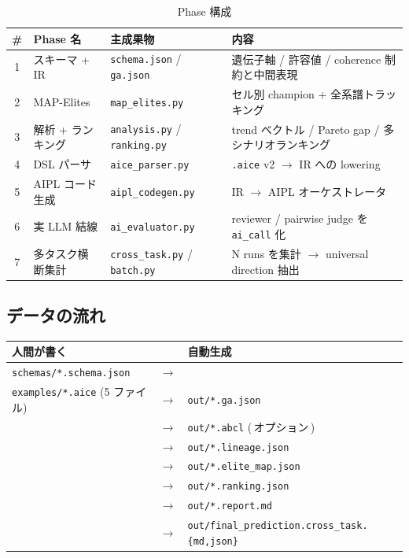 \documentclass[a4paper,11pt]{article}
\begin{document}
\begin{table}[h]
\centering
\caption{Phase 構成}
\label{tab:phases}
\small
\begin{tabularx}{\linewidth}{cllX}
\toprule
\# & Phase 名 & 主成果物 & 内容 \\
\midrule
1 & スキーマ + IR        & \texttt{schema.json} / \texttt{ga.json}    & 遺伝子軸 / 許容値 / coherence 制約と中間表現 \\
2 & MAP-Elites           & \texttt{map\_elites.py}                    & セル別 champion + 全系譜トラッキング \\
3 & 解析 + ランキング    & \texttt{analysis.py} / \texttt{ranking.py} & trend ベクトル / Pareto gap / 多シナリオランキング \\
4 & DSL パーサ           & \texttt{aice\_parser.py}                   & \texttt{.aice} v2 \(\to\) IR への lowering \\
5 & AIPL コード生成      & \texttt{aipl\_codegen.py}                  & IR \(\to\) AIPL オーケストレータ \\
6 & 実 LLM 結線          & \texttt{ai\_evaluator.py}                  & reviewer / pairwise judge を \texttt{ai\_call} 化 \\
7 & 多タスク横断集計     & \texttt{cross\_task.py} / \texttt{batch.py} & N runs を集計 \(\to\) universal direction 抽出 \\
\bottomrule
\end{tabularx}
\end{table}

\subsection{データの流れ}

\begin{center}
\small
\begin{tabular}{lcl}
\textbf{人間が書く} &        & \textbf{自動生成} \\
\midrule
\texttt{schemas/*.schema.json}        & $\rightarrow$ &                       \\
\texttt{examples/*.aice} (5 ファイル) & $\rightarrow$ & \texttt{out/*.ga.json} \\
                                      & $\rightarrow$ & \texttt{out/*.abcl} (\,オプション\,) \\
                                      & $\rightarrow$ & \texttt{out/*.lineage.json} \\
                                      & $\rightarrow$ & \texttt{out/*.elite\_map.json} \\
                                      & $\rightarrow$ & \texttt{out/*.ranking.json} \\
                                      & $\rightarrow$ & \texttt{out/*.report.md} \\
                                      & $\rightarrow$ & \texttt{out/final\_prediction.cross\_task.\{md,json\}}
\end{tabular}
\end{center}
\end{document}
